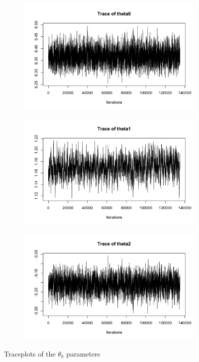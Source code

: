 \begin{figure}[H]
	\centering
	\begin{subfigure}{0.3\textwidth}
		\centering
		\includegraphics{figures/metropolis_vw/metropolis_vw_traceplot_theta0}
	\end{subfigure}
	\begin{subfigure}{0.3\textwidth}
		\centering
		\includegraphics{figures/metropolis_vw/metropolis_vw_traceplot_theta1}
	\end{subfigure}
	\begin{subfigure}{0.3\textwidth}
		\centering
		\includegraphics{figures/metropolis_vw/metropolis_vw_traceplot_theta2}
	\end{subfigure}
	\caption{Traceplots of the $\theta_k$ parameters}
	\label{fig:metropolis-vw-traceplots}
\end{figure}

